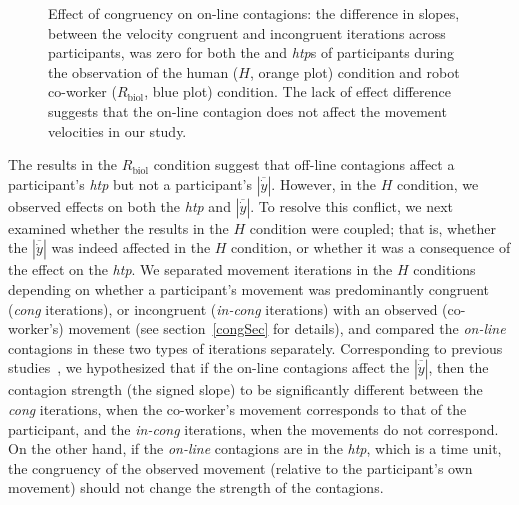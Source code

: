 \documentclass[a4paper, 12pt, oneside]{Thesis}  %
\begin{document}
\begin{figure}[t]
	\caption{Effect of congruency on on-line contagions: the difference in slopes, between the velocity congruent and incongruent iterations across participants, was zero for both the  and \textit{htp}s of participants during the observation of the human ($\textit{H}$, orange plot) condition and robot co-worker ($\textit{R}_{\text{biol}}$, blue plot) condition. The lack of effect difference suggests that the on-line contagion does not affect the movement velocities in our study.}
	\label{fig:cong}
\end{figure}

The results in the $R_{\text{biol}}$ condition suggest that off-line contagions affect a participant's {\it htp} but not a participant's $|\overline{\dot{y}}|$. However, in the $H$ condition, we observed effects on both the {\it htp} and $|\overline{\dot{y}}|$. To resolve this conflict, we next examined whether the results in the $H$ condition were coupled; that is, whether the $|\overline{\dot{y}}|$ was indeed affected in the $H$ condition, or whether it was a consequence of the effect on the {\it htp}. We separated movement iterations in the $H$ conditions depending on whether a participant's movement was predominantly congruent ({\it cong} iterations), or incongruent ({\it in-cong} iterations) with an observed (co-worker's) movement (see section~\ref{congSec} for details), and compared the {\it on-line} contagions in these two types of iterations separately. Corresponding to previous studies~\cite{Noy:B&C:2009, Kilner:SocialNeuro:2007, Bisio:PlosOne:2010}, we hypothesized that if the on-line contagions affect the $|\overline{\dot{y}}|$, then the contagion strength (the signed slope) to be significantly different between the {\it cong} iterations, when the co-worker's movement corresponds to that of the participant, and the {\it in-cong} iterations, when the movements do not correspond. On the other hand, if the {\it on-line} contagions are in the {\it htp}, which is a time unit, the congruency of the observed movement (relative to the participant's own movement) should not change the strength of the contagions.
\end{document}
